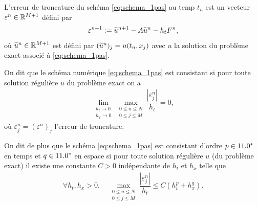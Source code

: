 \documentclass[12pt,a4paper,twoside]{article}
\begin{document}
\begin{definition}
  \label{def:troncature}
  L'erreur de troncature du sch\'ema \eqref{eq:schema_1pas}
  au temp $t_n$ est un vecteur $\varepsilon^n \in \mathbb{R}^{M+1}$
  d\'efini par
  \begin{align}
    \label{eq:troncature}
    \varepsilon^{n+1} := \widetilde{u}^{n+1} - A \widetilde{u}^n - h_t F^n ,
  \end{align}
  o\`u $\widetilde{u}^n \in \mathbb{R}^{M+1}$ est d\'efini par
  $(\widetilde{u}^n)_j = u(t_n,x_j)$ avec $u$ la solution du probl\`eme exact associ\'e \`a
  \eqref{eq:schema_1pas}.
\end{definition}

\begin{definition}[Consistance]
  \label{def:consistance}
  On dit que le sch\'ema num\'erique \eqref{eq:schema_1pas} est consistant si pour toute
  solution r\'eguli\`ere $u$ du probl\`eme exact on a
  \begin{align}
    \lim_{\substack{h_t \to 0\\ h_x \to 0}} \max_{\substack{0\leq n \leq N\\ 0 \leq j \leq M}} 
    \dfrac{| \varepsilon_j^n|}{h_t} = 0 ,
  \end{align}
  o\`u $\varepsilon_j^n = (\varepsilon^n)_j$ l'erreur de troncature.

  On dit de plus que le sch\'ema \eqref{eq:schema_1pas} est consistant d'ordre $p \in 11.0^*$
  en temps et $q \in 11.0^*$ en espace si pour toute solution r\'eguli\`ere $u$ (du probl\`eme exact)
  il existe une constante $C>0$ ind\'ependante de $h_t$ et $h_x$ telle que
  \begin{align}
    \forall h_t , h_x > 0 , \quad \max_{\substack{0\leq n \leq N\\ 0 \leq j \leq M}}
    \dfrac{| \varepsilon_j^n|}{h_t} \leq C (h_t^p + h_x^q) .
  \end{align}
\end{definition}
\end{document}
